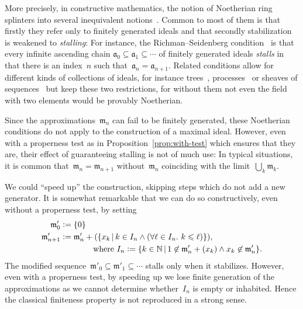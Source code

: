 \documentclass[com,11pt,crcready]{iosart2x}
\theoremstyle{definition}
\theoremstyle{plain}
\theoremstyle{remark}
\newcommand{\aaa}{\mathfrak{a}}
\newcommand{\mmm}{\mathfrak{m}}
\newcommand{\NN}{\mathbb{N}}
\newcommand{\defeq}{\vcentcolon=}
\renewcommand{\_}{\mathpunct{.}\,}
\begin{document}
More precisely, in constructive mathematics, the notion of Noetherian ring
splinters into several inequivalent notions~\cite{richman:noetherian,mines-richman-ruitenburg:constructive-algebra,perdry:noetherian,perdry:lazy,perdry-schuster:noetherian,schuster-zappe:noetherian,coquand-lombardi:krull,coquand:invariant,tennenbaum:hilbert,seidenberg:noether,jacobsson-lofwall:standard}. Common to most of them
is that firstly they refer only to finitely generated ideals and that secondly
stabilization is weakened to \emph{stalling}: For instance, the Richman--Seidenberg
condition~\cite[Section~III.2]{mines-richman-ruitenburg:constructive-algebra}
is that every infinite ascending chain
$\aaa_0 \subseteq \aaa_1 \subseteq \cdots$ of finitely generated ideals
\emph{stalls} in that there is an index~$n$ such that~$\aaa_n = \aaa_{n+1}$.
Related conditions allow for different kinds of collections of ideals, for
instance trees~\cite{richman:noetherian}, processes~\cite[Section~3.9]{blechschmidt:phd} or
sheaves of sequences~\cite{coquand-lombardi:krull,coquand:invariant,blechschmidt:multiverse}
but keep these two restrictions, for without them not
even the field with two elements would be provably Noetherian.

Since the approximations~$\mmm_n$ can fail to be finitely generated, these
Noetherian conditions do not apply to the construction of a maximal ideal.
However, even with a properness test as in Proposition~\ref{prop:with-test}
which ensures that they are, their effect of guaranteeing stalling is not of
much use: In typical situations, it is common that~$\mmm_n = \mmm_{n+1}$
without~$\mmm_n$ coinciding with the limit~$\bigcup_k \mmm_k$.

We could ``speed up'' the construction, skipping steps which do not add a new
generator. It is somewhat remarkable that we can do so constructively, even
without a properness test, by setting
\begin{align*}
  \mmm'_0 &\defeq \{ 0 \} \\
  \mmm'_{n+1} &\defeq \mmm'_n + (\{ x_k \,|\,
    k \in I_n \wedge (\forall \ell \in I_n\_ k \leq \ell) \}), \\
  &\qquad\qquad\text{where $I_n \defeq \{ k \in \NN \,|\, 1 \not\in \mmm'_n +
  (x_k) \wedge x_k \not\in \mmm'_n \}$.}
\end{align*}
The modified sequence~$\mmm'_0 \subseteq \mmm'_1 \subseteq \cdots$ stalls only
when it stabilizes. However, even with a properness test, by speeding up we lose
finite generation of the approximations as we cannot determine whether~$I_n$ is
empty or inhabited. Hence the classical
finiteness property is not reproduced in a strong sense.
\end{document}
